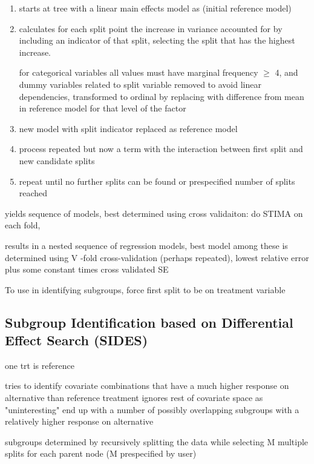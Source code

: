 \documentclass[10pt]{article}
\begin{document}
\begin{enumerate}
  \item starts at tree with a linear main effects model as (initial reference model)
  \item calculates for each split point the increase in variance accounted for by including an indicator of that split, selecting the split that has the highest increase.
  
  for categorical variables all values must have marginal frequency $\geq$ 4, and dummy variables related to split variable removed to avoid linear dependencies, transformed to ordinal by replacing with difference from mean in reference model for that level of the factor
  \item new model with split indicator replaced as reference model
  \item process repeated but now a term with the interaction between first split and new candidate splits
  \item repeat until no further splits can be found or prespecified number of splits reached
\end{enumerate}

yields sequence of models, best determined using cross validaiton: do STIMA on each fold, 

results in a nested sequence of regression models, best model among these is determined using V -fold cross-validation (perhaps repeated), lowest relative error plus some constant times cross validated SE

To use in identifying subgroups, force first split to be on treatment variable



\subsection{Subgroup Identification based on Differential Effect Search (SIDES)} %
\label{sub:SIDES}



one trt is reference

tries to identify covariate combinations that have a much higher response on alternative than reference treatment
ignores rest of covariate space as "uninteresting"
end up with a number of possibly overlapping subgroups with a relatively higher response on alternative

subgroups determined by recursively splitting the data while selecting M multiple splits for each parent node (M prespecified by user)
\end{document}
